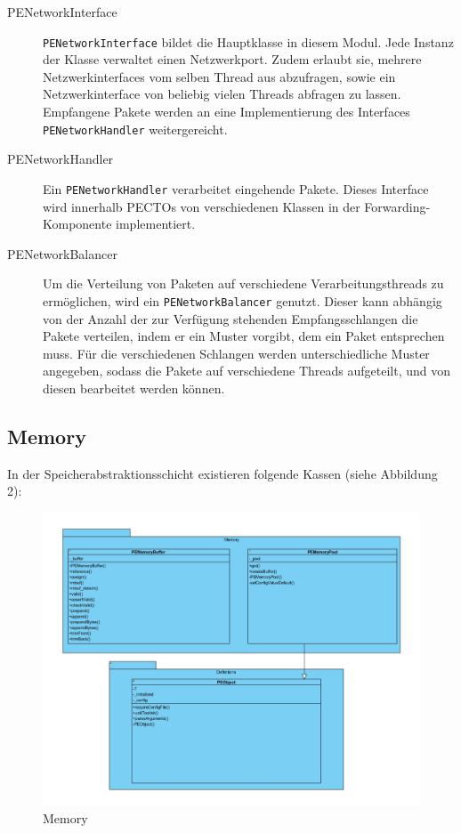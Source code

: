 \documentclass[a4paper, 11pt, ngerman, fleqn]{article}
\begin{document}
\begin{description}
	\item[PENetworkInterface] 
	\texttt{PENetworkInterface} bildet die Hauptklasse in diesem Modul. 
	Jede Instanz der Klasse verwaltet einen Netzwerkport.
	Zudem erlaubt sie, mehrere Netzwerkinterfaces vom selben Thread aus abzufragen, sowie ein Netzwerkinterface von beliebig vielen Threads abfragen zu lassen.
	Empfangene Pakete werden an eine Implementierung des Interfaces \texttt{PENetworkHandler} weitergereicht.
	
	\item[PENetworkHandler]
	Ein \texttt{PENetworkHandler} verarbeitet eingehende Pakete. 
	Dieses Interface wird innerhalb PECTOs von verschiedenen Klassen in der Forwarding-Komponente implementiert.
	
	\item[PENetworkBalancer]
	Um die Verteilung von Paketen auf verschiedene Verarbeitungsthreads zu ermöglichen, wird ein \texttt{PENetworkBalancer} genutzt.
	Dieser kann abhängig von der Anzahl der zur Verfügung stehenden Empfangsschlangen die Pakete verteilen, indem er ein Muster vorgibt, dem ein Paket entsprechen muss.
	Für die verschiedenen Schlangen werden unterschiedliche Muster angegeben, sodass die Pakete auf verschiedene Threads aufgeteilt, und von diesen bearbeitet werden können. 
\end{description}


\subsection{Memory}
In der Speicherabstraktionsschicht existieren folgende Kassen (siehe Abbildung 2):

\begin{figure}
	\begin{center}
		\includegraphics[width=1 \textwidth]{figures/Memory.pdf}
		\caption{Memory}
	\end{center}
\end{figure}
\end{document}
